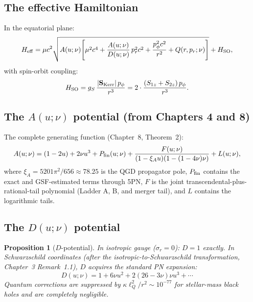 \documentclass[11pt,a4paper]{article}
\theoremstyle{plain}
\newtheorem{proposition}[theorem]{Proposition}
\theoremstyle{definition}
\theoremstyle{remark}
\newcommand{\lQ}{\ell_Q}
\newcommand{\Heff}{H_{\mathrm{eff}}}
\newcommand{\xiA}{\xi_A}
\begin{document}
\subsection{The effective Hamiltonian}

In the equatorial plane:
\begin{equation}
  \Heff = \mu c^2\sqrt{A(u;\nu)\!\left[\mu^2c^4
    + \frac{A(u;\nu)}{D(u;\nu)}\,p_r^2 c^2
    + \frac{p_\phi^2 c^2}{r^2}
    + Q(r,p_r;\nu)\right]}
    + H_{\rm SO},
  \label{eq:Heff}
\end{equation}
with spin-orbit coupling:
\begin{equation}
  H_{\rm SO} = g_S\,\frac{|\mathbf{S}_{\rm Kerr}|\,p_\phi}{r^3}
  = 2\cdot\frac{(S_{1z}+S_{2z})\,p_\phi}{r^3}.
  \label{eq:H_SO}
\end{equation}

\subsection{The $A(u;\nu)$ potential (from Chapters 4 and 8)}

The complete generating function (Chapter~8, Theorem~2):
\begin{equation}
  A(u;\nu) = (1-2u)+2\nu u^3 + P_{\rm fin}(u;\nu)
    + \frac{F(u;\nu)}{(1-\xiA u)(1-(1-4\nu)\nu)}
    + L(u;\nu),
  \label{eq:A_complete}
\end{equation}
where $\xiA = 5201\pi^2/656\approx78.25$ is the QGD propagator pole,
$P_{\rm fin}$ contains the exact and GSF-estimated terms through 5PN,
$F$ is the joint transcendental-plus-rational-tail polynomial (Ladder A, B,
and merger tail), and $L$ contains the logarithmic tails.

\subsection{The $D(u;\nu)$ potential}

\begin{proposition}[$D$-potential]\label{prop:D}
In isotropic gauge ($\sigma_r = 0$): $D = 1$ exactly.  In Schwarzschild
coordinates (after the isotropic-to-Schwarzschild transformation, Chapter~3
Remark~1.1), $D$ acquires the standard PN expansion:
\begin{equation}
  D(u;\nu) = 1 + 6\nu u^2 + 2(26-3\nu)\nu u^3 + \cdots
  \label{eq:D}
\end{equation}
Quantum corrections are suppressed by $\kappa\lQ^2/r^2\sim10^{-77}$ for
stellar-mass black holes and are completely negligible.
\end{proposition}
\end{document}
